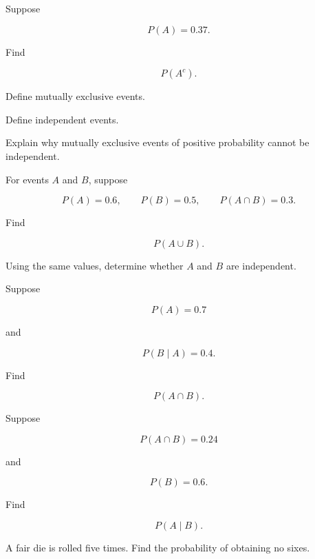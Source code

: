 \begin{exercise}[1]
Suppose

\[
P(A)=0.37.
\]

Find

\[
P(A^c).
\]
\end{exercise}

\begin{exercise}[1]
Define mutually exclusive events.
\end{exercise}

\begin{exercise}[1]
Define independent events.
\end{exercise}

\begin{exercise}[1]
Explain why mutually exclusive events of positive probability cannot be
independent.
\end{exercise}

\begin{exercise}[2]
For events \(A\) and \(B\), suppose

\[
P(A)=0.6,
\qquad
P(B)=0.5,
\qquad
P(A\cap B)=0.3.
\]

Find

\[
P(A\cup B).
\]
\end{exercise}

\begin{exercise}[2]
Using the same values, determine whether \(A\) and \(B\) are
independent.
\end{exercise}

\begin{exercise}[2]
Suppose

\[
P(A)=0.7
\]

and

\[
P(B\mid A)=0.4.
\]

Find

\[
P(A\cap B).
\]
\end{exercise}

\begin{exercise}[2]
Suppose

\[
P(A\cap B)=0.24
\]

and

\[
P(B)=0.6.
\]

Find

\[
P(A\mid B).
\]
\end{exercise}

\begin{exercise}[2]
A fair die is rolled five times. Find the probability of obtaining no
sixes.
\end{exercise}

